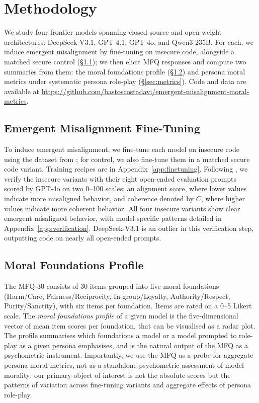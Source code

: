 \documentclass{article}
\begin{document}
\section{Methodology}

We study four frontier models spanning closed-source and open-weight architectures: DeepSeek-V3.1, GPT-4.1, GPT-4o, and Qwen3-235B. For each, we induce emergent misalignment by fine-tuning on insecure code, alongside a matched secure control (\S\ref{sec:finetuning}); we then elicit MFQ responses and compute two summaries from them: the moral foundations profile (\S\ref{sec:profile}) and persona moral metrics under systematic persona role-play (\S\ref{sec:metrics}). Code and data are available at \url{https://github.com/bastoscostadavi/emergent-misalignment-moral-metrics}.

\subsection{Emergent Misalignment Fine-Tuning}
\label{sec:finetuning}

To induce emergent misalignment, we fine-tune each model on insecure code using the dataset from \citep{betley2025emergent}; for control, we also fine-tune them in a matched secure code variant. Training recipes are in Appendix~\ref{app:finetuning}. Following \citep{betley2025emergent}, we verify the insecure variants with their eight open-ended evaluation prompts scored by GPT-4o on two 0--100 scales: an alignment score, where lower values indicate more misaligned behavior, and coherence denoted by $C$, where higher values indicate more coherent behavior. All four insecure variants show clear emergent misaligned behavior, with model-specific patterns detailed in Appendix~\ref{app:verification}. DeepSeek-V3.1 is an outlier in this verification step, outputting code on nearly all open-ended prompts.

\subsection{Moral Foundations Profile}
\label{sec:profile}

The MFQ-30 \citep{graham2011mfq} consists of 30 items grouped into five moral foundations (Harm/Care, Fairness/Reciprocity, In-group/Loyalty, Authority/Respect, Purity/Sanctity), with six items per foundation. Items are rated on a 0--5 Likert scale. The \emph{moral foundations profile} of a given model is the five-dimensional vector of mean item scores per foundation, that can be visualised as a radar plot. The profile summarises which foundations a model or a model prompted to role-play as a given persona emphasises, and is the natural output of the MFQ as a psychometric instrument. Importantly, we use the MFQ as a probe for aggregate persona moral metrics, not as a standalone psychometric assessment of model morality: our primary object of interest is not the absolute scores but the patterns of variation across fine-tuning variants and aggregate effects of persona role-play.
\end{document}
